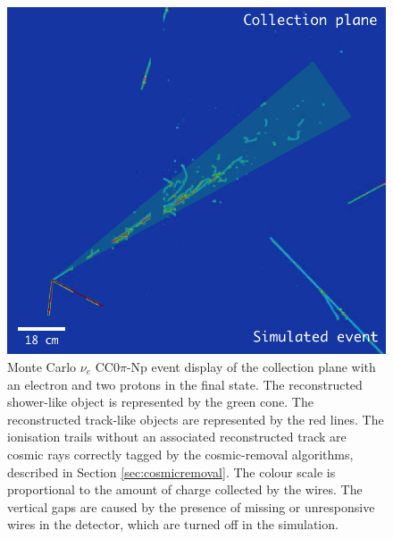 \begin{figure}[htbp]
	\begin{center}
    	\includegraphics[width=0.85\linewidth]{figures/evd.png}
    	\caption{Monte Carlo $\nu_{e}$ CC0$\pi$-Np event display of the collection plane with an electron and two protons in the final state. The reconstructed shower-like object is represented by the green cone. The reconstructed track-like objects are represented by the red lines. The ionisation trails without an associated reconstructed track are cosmic rays correctly tagged by the cosmic-removal algorithms, described in Section \ref{sec:cosmicremoval}. The colour scale is proportional to the amount of charge collected by the wires. {The vertical gaps are caused by the presence of missing or unresponsive wires in the detector, which are turned off in the simulation.}} \label{fig:evd}
	\end{center}
\end{figure}


